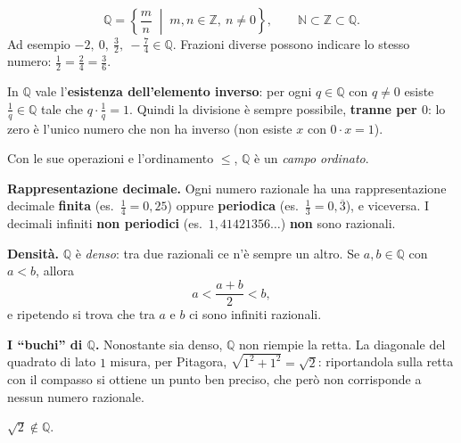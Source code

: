 \documentclass[11pt,a4paper]{article}
\begin{document}
\[
\mathbb{Q} = \left\{ \frac{m}{n} \;\middle|\; m, n \in \mathbb{Z},\ n \neq 0 \right\},
\qquad \mathbb{N} \subset \mathbb{Z} \subset \mathbb{Q}.
\]
Ad esempio $-2,\ 0,\ \frac{3}{2},\ -\frac{7}{4} \in \mathbb{Q}$.
Frazioni diverse possono indicare lo stesso numero:
$\frac12 = \frac24 = \frac36$.

In $\mathbb{Q}$ vale l'\textbf{esistenza dell'elemento inverso}: per ogni
$q \in \mathbb{Q}$ con $q \neq 0$ esiste $\frac{1}{q} \in \mathbb{Q}$ tale
che $q \cdot \frac{1}{q} = 1$. Quindi la divisione è sempre possibile,
\textbf{tranne per $0$}: lo zero è l'unico numero che non ha inverso
(non esiste $x$ con $0 \cdot x = 1$).

Con le sue operazioni e l'ordinamento $\leq$, $\mathbb{Q}$ è un
\emph{campo ordinato}.

\textbf{Rappresentazione decimale.} Ogni numero razionale ha una
rappresentazione decimale \textbf{finita} (es.\ $\frac14 = 0{,}25$) oppure
\textbf{periodica} (es.\ $\frac13 = 0{,}\overline{3}$), e viceversa.
I decimali infiniti \textbf{non periodici} (es.\ $1{,}41421356\dots$)
\textbf{non} sono razionali.

\textbf{Densità.} $\mathbb{Q}$ è \emph{denso}: tra due razionali ce n'è
sempre un altro. Se $a, b \in \mathbb{Q}$ con $a < b$, allora
\[
a < \frac{a + b}{2} < b,
\]
e ripetendo si trova che tra $a$ e $b$ ci sono infiniti razionali.

\textbf{I ``buchi'' di $\mathbb{Q}$.} Nonostante sia denso, $\mathbb{Q}$
non riempie la retta. La diagonale del quadrato di lato $1$ misura, per
Pitagora, $\sqrt{1^2 + 1^2} = \sqrt{2}$: riportandola sulla retta con il
compasso si ottiene un punto ben preciso, che però non corrisponde a nessun
numero razionale.

\begin{center}
\end{center}

\begin{teorema}
$\sqrt{2} \notin \mathbb{Q}$.
\end{teorema}
\end{document}
